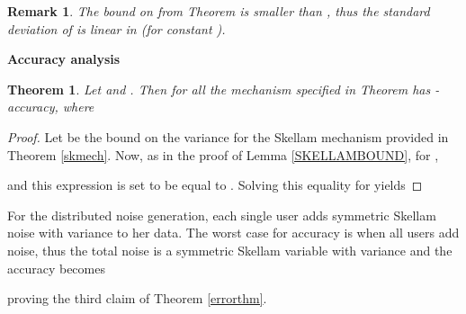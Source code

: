 \documentclass[10pt]{extarticle}
\newtheorem{Thm}{Theorem}
\newtheorem{Rem}{Remark}
\begin{document}
\begin{Rem} The bound on  from Theorem \text{\upshape \ref{skmech}} is smaller than , thus the standard deviation of  is linear in  (for constant ).
\end{Rem}\par\bigskip\bigskip

\noindent\textbf{Accuracy analysis}

\begin{Thm}\label{erroranalysis} Let  and . Then for all  the mechanism specified in Theorem  has -accuracy, where

\end{Thm}
\begin{proof} Let  be the bound on the variance for the Skellam mechanism provided in Theorem \ref{skmech}. Now, as in the proof of Lemma \ref{SKELLAMBOUND}, for ,

and this expression is set to be equal to . Solving this equality for  yields

\end{proof}\par\medskip

\noindent For the distributed noise generation, each single user adds symmetric Skellam noise with variance  to her data. The worst case for accuracy is when all  users add noise, thus the total noise  is a symmetric Skellam variable with variance  and the accuracy becomes

proving the third claim of Theorem \ref{errorthm}.



\end{document}

